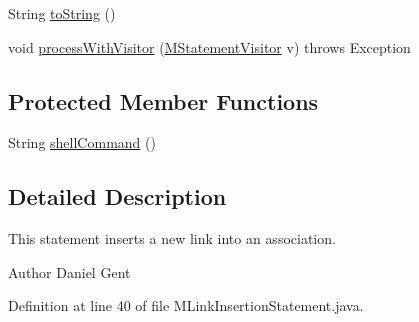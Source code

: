 \begin{DoxyCompactItemize}
\item 
String \hyperlink{classorg_1_1tzi_1_1use_1_1uml_1_1sys_1_1soil_1_1_m_link_insertion_statement_aa14714804f59996cc2526d3116696dd2}{to\-String} ()
\item 
void \hyperlink{classorg_1_1tzi_1_1use_1_1uml_1_1sys_1_1soil_1_1_m_link_insertion_statement_a4f75f3cc54bdb0777485b17a2b4d3c6d}{process\-With\-Visitor} (\hyperlink{interfaceorg_1_1tzi_1_1use_1_1uml_1_1sys_1_1soil_1_1_m_statement_visitor}{M\-Statement\-Visitor} v)  throws Exception 
\end{DoxyCompactItemize}
\subsection*{Protected Member Functions}
\begin{DoxyCompactItemize}
\item 
String \hyperlink{classorg_1_1tzi_1_1use_1_1uml_1_1sys_1_1soil_1_1_m_link_insertion_statement_a75bf7e69e6b4c6b7997431c511dafb31}{shell\-Command} ()
\end{DoxyCompactItemize}


\subsection{Detailed Description}
This statement inserts a new link into an association.

\begin{DoxyAuthor}{Author}
Daniel Gent 
\end{DoxyAuthor}


Definition at line 40 of file M\-Link\-Insertion\-Statement.\-java.




